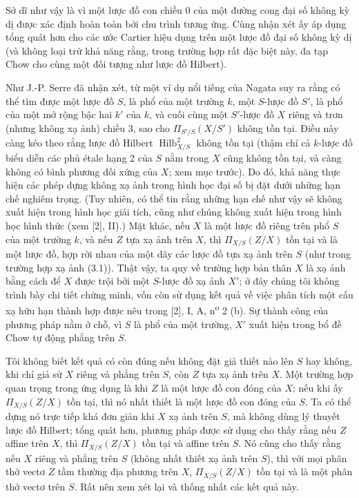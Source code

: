 Sở dĩ như vậy là vì một lược đồ con chiều 0 của một đường cong đại số không
kỳ dị được xác định hoàn toàn bởi chu trình tương ứng. Cùng nhận xét ấy áp
dụng tổng quát hơn cho các ước Cartier hiệu dụng trên một lược đồ đại số không
kỳ dị (và không loại trừ khả năng rằng, trong trường hợp rất đặc biệt này, đa
tạp Chow cho cùng một đối tượng như lược đồ Hilbert).


Như J.-P. Serre đã nhận xét, từ một ví dụ nổi tiếng của Nagata suy ra rằng có
thể tìm được một lược đồ $S$, là phổ của một trường $k$, một $S$-lược đồ $S'$,
là phổ của một mở rộng bậc hai $k'$ của $k$, và cuối cùng một $S'$-lược đồ $X$
riêng và trơn (nhưng không xạ ảnh) chiều 3, sao cho $\Pi_{S'/S}(X/S')$ không
tồn tại. Điều này càng kéo theo rằng lược đồ Hilbert
$\operatorname{Hilb}^2_{X/S}$ không tồn tại (thậm chí cả $k$-lược đồ biểu diễn
các phủ étale hạng 2 của $S$ nằm trong $X$ cũng không tồn tại, và càng không có
bình phương đối xứng của $X$; xem mục trước). Do đó, khả năng thực hiện các
phép dựng không xạ ảnh trong hình học đại số bị đặt dưới những hạn chế nghiêm
trọng. (Tuy nhiên, có thể tin rằng những hạn chế như vậy sẽ không xuất hiện
trong hình học giải tích, cũng như chúng không xuất hiện trong hình học hình
thức (xem [2], II).) Mặt khác, nếu $X$ là một lược đồ riêng trên phổ $S$ của
một trường $k$, và nếu $Z$ tựa xạ ảnh trên $X$, thì $\Pi_{X/S}(Z/X)$ tồn tại
và là một lược đồ, hợp rời nhau của một dãy các lược đồ tựa xạ ảnh trên $S$
(như trong trường hợp xạ ảnh (3.1)). Thật vậy, ta quy về trường hợp bản thân
$X$ là xạ ảnh bằng cách để $X$ được trội bởi một $S$-lược đồ xạ ảnh $X'$; ở đây
chúng tôi không trình bày chi tiết chứng minh, vốn còn sử dụng kết quả về việc
phân tích một cấu xạ hữu hạn thành hợp được nêu trong [2], I, A,
n\textsuperscript{o} 2 (b). Sự thành công của phương pháp nằm ở chỗ, vì $S$ là
phổ của một trường, $X'$ xuất hiện trong bổ đề Chow tự động phẳng trên $S$.

Tôi không biết kết quả có còn đúng nếu không đặt giả thiết nào lên $S$ hay
không, khi chỉ giả sử $X$ riêng và phẳng trên $S$, còn $Z$ tựa xạ ảnh trên
$X$. Một trường hợp quan trọng trong ứng dụng là khi $Z$ là một lược đồ con
đóng của $X$; nếu khi ấy $\Pi_{X/S}(Z/X)$ tồn tại, thì nó nhất thiết là một
lược đồ con đóng của $S$. Ta có thể
dựng nó trực tiếp khá đơn giản khi $X$ xạ ảnh trên $S$, mà không dùng lý
thuyết lược đồ Hilbert; tổng quát hơn, phương pháp được sử dụng cho thấy rằng
nếu $Z$ affine trên $X$, thì $\Pi_{X/S}(Z/X)$ tồn tại và affine trên $S$. Nó
cũng cho thấy rằng nếu $X$ riêng và phẳng trên $S$ (không nhất thiết xạ ảnh
trên $S$), thì với mọi phân thớ vectơ $Z$ tầm thường địa phương trên $X$,
$\Pi_{X/S}(Z/X)$ tồn tại và là một phân thớ vectơ trên $S$. Rất nên xem xét
lại và thống nhất các kết quả này.


